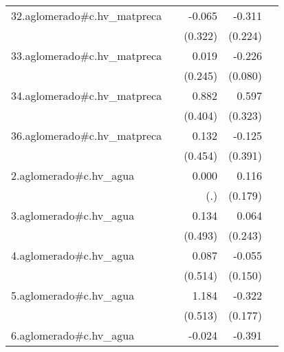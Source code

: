 {\begin{longtable}{l*{4}{D{.}{.}{-1}}}
\addlinespace
32.aglomerado#c.hv\_matpreca&                     &      -0.065         &      -0.311         &                     \\
            &                     &     (0.322)         &     (0.224)         &                     \\
\addlinespace
33.aglomerado#c.hv\_matpreca&                     &       0.019         &      -0.226\sym{**} &                     \\
            &                     &     (0.245)         &     (0.080)         &                     \\
\addlinespace
34.aglomerado#c.hv\_matpreca&                     &       0.882\sym{*}  &       0.597         &                     \\
            &                     &     (0.404)         &     (0.323)         &                     \\
\addlinespace
36.aglomerado#c.hv\_matpreca&                     &       0.132         &      -0.125         &                     \\
            &                     &     (0.454)         &     (0.391)         &                     \\
\addlinespace
2.aglomerado#c.hv\_agua&                     &       0.000         &       0.116         &                     \\
            &                     &         (.)         &     (0.179)         &                     \\
\addlinespace
3.aglomerado#c.hv\_agua&                     &       0.134         &       0.064         &                     \\
            &                     &     (0.493)         &     (0.243)         &                     \\
\addlinespace
4.aglomerado#c.hv\_agua&                     &       0.087         &      -0.055         &                     \\
            &                     &     (0.514)         &     (0.150)         &                     \\
\addlinespace
5.aglomerado#c.hv\_agua&                     &       1.184\sym{*}  &      -0.322         &                     \\
            &                     &     (0.513)         &     (0.177)         &                     \\
\addlinespace
6.aglomerado#c.hv\_agua&                     &      -0.024         &      -0.391\sym{***}&                     \\

\end{longtable}}
